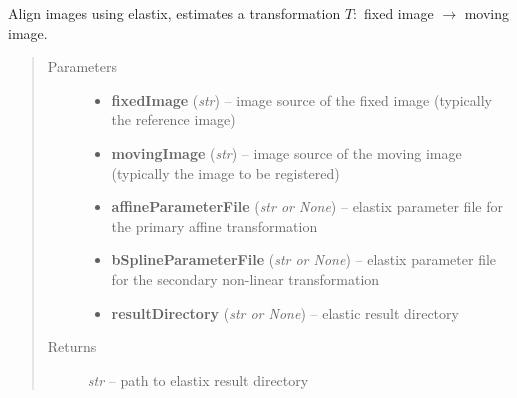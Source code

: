 \documentclass[letterpaper,10pt,english]{sphinxmanual}
\begin{document}

\begin{fulllineitems}
\label{api/ClearMap.Alignment:ClearMap.Alignment.Elastix.alignData}
Align images using elastix, estimates a transformation \(T:\) fixed image \(\rightarrow\) moving image.
\begin{quote}\begin{description}
\item[{Parameters}] \leavevmode\begin{itemize}
\item {} 
\textbf{fixedImage} (\emph{str}) --
image source of the fixed image (typically the reference image)

\item {} 
\textbf{movingImage} (\emph{str}) --
image source of the moving image (typically the image to be registered)

\item {} 
\textbf{affineParameterFile} (\emph{str or None}) --
elastix parameter file for the primary affine transformation

\item {} 
\textbf{bSplineParameterFile} (\emph{str or None}) --
elastix parameter file for the secondary non-linear transformation

\item {} 
\textbf{resultDirectory} (\emph{str or None}) --
elastic result directory

\end{itemize}

\item[{Returns}] \leavevmode
\emph{str} --
path to elastix result directory

\end{description}\end{quote}

\end{fulllineitems}

\end{document}
